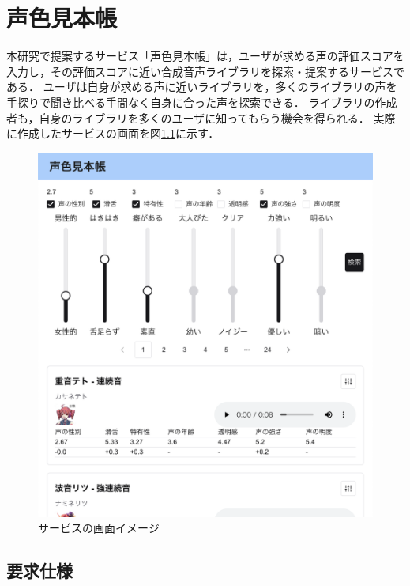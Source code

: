 \chapter{声色見本帳}
\thispagestyle{myheadings}

本研究で提案するサービス「声色見本帳」は，ユーザが求める声の評価スコアを入力し，その評価スコアに近い合成音声ライブラリを探索・提案するサービスである．
ユーザは自身が求める声に近いライブラリを，多くのライブラリの声を手探りで聞き比べる手間なく自身に合った声を探索できる．
ライブラリの作成者も，自身のライブラリを多くのユーザに知ってもらう機会を得られる．
実際に作成したサービスの画面を図\ref{fig:site_image}に示す．

\begin{figure}[h]
  \centering
  \includegraphics[width=0.9\linewidth]{fig/site_image.png}
  \caption{サービスの画面イメージ}
  \label{fig:site_image}
\end{figure}

\section{要求仕様}

